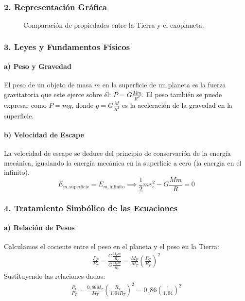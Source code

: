 \subsubsection*{2. Representación Gráfica}
\begin{figure}[H]
    \centering
    \caption{Comparación de propiedades entre la Tierra y el exoplaneta.}
\end{figure}

\subsubsection*{3. Leyes y Fundamentos Físicos}
\paragraph{a) Peso y Gravedad}
El peso de un objeto de masa $m$ en la superficie de un planeta es la fuerza gravitatoria que este ejerce sobre él: $P = G\frac{M m}{R^2}$. El peso también se puede expresar como $P=mg$, donde $g = G\frac{M}{R^2}$ es la aceleración de la gravedad en la superficie.
\paragraph{b) Velocidad de Escape}
La velocidad de escape se deduce del principio de conservación de la energía mecánica, igualando la energía mecánica en la superficie a cero (la energía en el infinito).
$$ E_{m, \text{superficie}} = E_{m, \text{infinito}} \implies \frac{1}{2}mv_e^2 - G\frac{Mm}{R} = 0 $$

\subsubsection*{4. Tratamiento Simbólico de las Ecuaciones}
\paragraph{a) Relación de Pesos}
Calculamos el cociente entre el peso en el planeta y el peso en la Tierra:
\begin{gather}
    \frac{P_P}{P_T} = \frac{G \frac{M_P m}{R_P^2}}{G \frac{M_T m}{R_T^2}} = \frac{M_P}{M_T} \left(\frac{R_T}{R_P}\right)^2
\end{gather}
Sustituyendo las relaciones dadas:
\begin{gather}
    \frac{P_P}{P_T} = \frac{0,86 M_T}{M_T} \left(\frac{R_T}{1,04 R_T}\right)^2 = 0,86 \left(\frac{1}{1,04}\right)^2
\end{gather}

